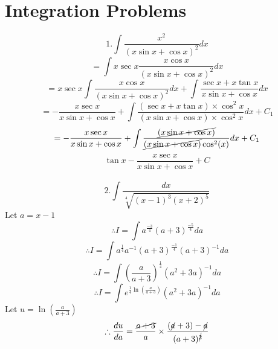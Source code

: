 \documentclass[14pt]{article}
\begin{document}
	\section{Integration Problems}
	\begin{equation*}
		1. \int \frac{x^2}{(x\sin x+\cos x)^2}dx
	\end{equation*}
	\begin{equation*}
		=\int x \sec x \frac{x \cos x}{(x\sin x+\cos x)^2}dx
	\end{equation*}
	\begin{equation*}
		=x \sec x \int \frac{x \cos x}{(x\sin x+\cos x)^2}dx + \int \frac{\sec x+x\tan x}{x\sin x+\cos x}dx
	\end{equation*}
	\begin{equation*}
		=-\frac{x\sec x}{x\sin x+\cos x}+\int\frac{(\sec x+x\tan x)\times\cos^2 x}{(x\sin x+\cos x)\times\cos^2 x}dx+C_1
	\end{equation*}
	\begin{equation*}
		=-\frac{x\sec x}{x\sin x+\cos x}+\int\frac{\cancel{(x\sin x+\cos x)}}{\cancel{(x\sin x+\cos x)}\cos^2(x)}dx+C_1
	\end{equation*}
	\begin{equation*}
		\boxed{\tan x -\frac{x\sec x}{x\sin x+\cos x}+C}
	\end{equation*}
	\\ \begin{equation*}
		2.\int \frac{dx}{\sqrt[4]{(x-1)^3(x+2)^5}}
	\end{equation*}
	Let $a=x-1$
	\begin{equation*}
		\therefore I = \int a^{\frac{-3}{4}} (a+3)^{\frac{-5}{4}}da
	\end{equation*}
	\begin{equation*}
		\therefore I = \int a^{\frac{1}{4}} a^{-1} (a+3)^{\frac{-1}{4}} (a+3)^{-1}da
	\end{equation*}
	\begin{equation*}
		\therefore I = \int (\frac{a}{a+3})^{\frac{1}{4}} (a^2+3a)^{-1}da
	\end{equation*}
	\begin{equation*}
		\therefore I = \int e^{\frac{1}{4}\ln(\frac{a}{a+3})} (a^2+3a)^{-1}da
	\end{equation*}
	Let $u=\ln(\frac{a}{a+3})$
	\\ \begin{equation*}
		\therefore \frac{du}{da} = \frac{\cancel{a+3}}{a}\times\frac{(\cancel{a}+3)-\cancel{a}}{(a+3)^{\cancel{2}}}
	\end{equation*}
\end{document}

